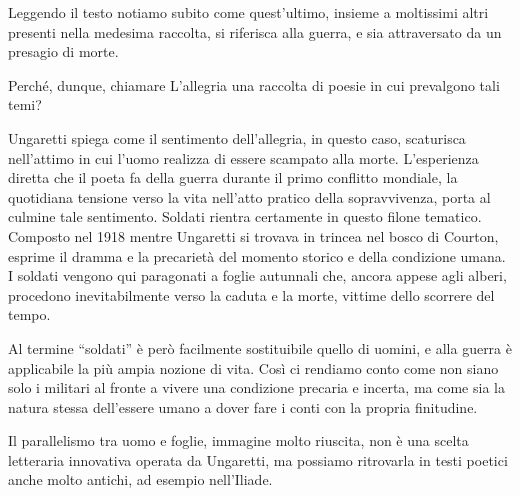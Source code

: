 Leggendo il testo notiamo subito come quest’ultimo, insieme a moltissimi altri presenti nella medesima raccolta, si riferisca alla guerra, e sia attraversato da un presagio di morte.

Perché, dunque, chiamare L’allegria una raccolta di poesie in cui prevalgono tali temi?

Ungaretti spiega come il sentimento dell’allegria, in questo caso, scaturisca nell’attimo in cui l’uomo realizza di essere scampato alla morte. L’esperienza diretta che il poeta fa della guerra durante il primo conflitto mondiale, la quotidiana tensione verso la vita nell’atto pratico della sopravvivenza, porta al culmine tale sentimento. Soldati rientra certamente in questo filone tematico. Composto nel 1918 mentre Ungaretti si trovava in trincea nel bosco di Courton, esprime il dramma e la precarietà del momento storico e della condizione umana. I soldati vengono qui paragonati a foglie autunnali che, ancora appese agli alberi, procedono inevitabilmente verso la caduta e la morte, vittime dello scorrere del tempo.

Al termine “soldati” è però facilmente sostituibile quello di uomini, e alla guerra è applicabile la più ampia nozione di vita. Così ci rendiamo conto come non siano solo i militari al fronte a vivere una condizione precaria e incerta, ma come sia la natura stessa dell’essere umano a dover fare i conti con la propria finitudine.

Il parallelismo tra uomo e foglie, immagine molto riuscita, non è una scelta letteraria innovativa operata da Ungaretti, ma possiamo ritrovarla in testi poetici anche molto antichi, ad esempio nell’Iliade.
